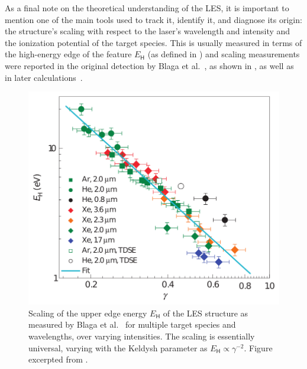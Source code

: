 
As a final note on the theoretical understanding of the LES, it is important to mention one of the main tools used to track it, identify it, and diagnose its origin: the structure's scaling with respect to the laser's wavelength and intensity and the ionization potential of the target species. This is usually measured in terms of the high-energy edge of the feature $E_\mathsf{H}$ (as defined in ) and scaling measurements were reported in the original detection by Blaga et al.~\cite{blaga_original_LES}, as shown in , as well as in later calculations~\cite{CTMC1, lemell_classicalquantum_2013, murnane_TCSFA_tunnel_exit, LES_Scaling}.





\begin{figure}[thb]
  \centering
  \includegraphics[scale=1]{6-LES/Figures/figure6N.png}
  \caption[
  Scaling of the upper edge energy of the LES, as measured by C.I. Blaga~et~al.
  ]{
  Scaling of the upper edge energy $E_\mathsf{H}$ of the LES structure as measured by Blaga et al.~\cite{blaga_original_LES} for multiple target species and wavelengths, over varying intensities. The scaling is essentially universal, varying with the Keldysh parameter as $E_\mathsf{H}\propto\gamma^{-2}$.
  Figure excerpted from .
  }
\label{f6-blaga-scaling-original-figure}
\end{figure}

